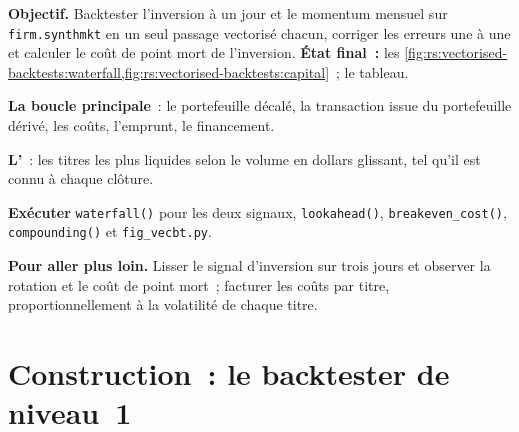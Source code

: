 \begin{tutorial}
\textbf{Objectif.} Backtester l'inversion à un jour et le momentum mensuel sur \texttt{firm.synthmkt} en un seul passage vectorisé chacun, corriger les erreurs une à une
et calculer le coût de point mort de l'inversion. \textbf{État final~:}
les \cref{fig:rs:vectorised-backtests:waterfall,fig:rs:vectorised-backtests:capital}~; le tableau.
\begin{tutsteps}
\item \textbf{La boucle principale}~: le portefeuille décalé, la transaction issue du portefeuille dérivé, les coûts, l'emprunt, le financement.
\label{lst:rs:vectorised-backtests:loop}
\item \textbf{L'}~: les titres les plus liquides selon le volume en dollars glissant, tel qu'il est connu à chaque clôture.
\label{lst:rs:vectorised-backtests:liquid}
\item \textbf{Exécuter} \texttt{waterfall()} pour les deux signaux, \texttt{lookahead()}, \texttt{breakeven\_cost()}, \texttt{compounding()} et
\texttt{fig\_vecbt.py}.
\end{tutsteps}
\textbf{Pour aller plus loin.} Lisser le signal d'inversion sur trois jours et observer la rotation et le coût de point mort~; facturer les coûts par titre, proportionnellement
à la volatilité de chaque titre.
\end{tutorial}

\section{Construction~: le backtester de niveau~1}\label{bld:rs:vectorised-backtests:vecbt}

